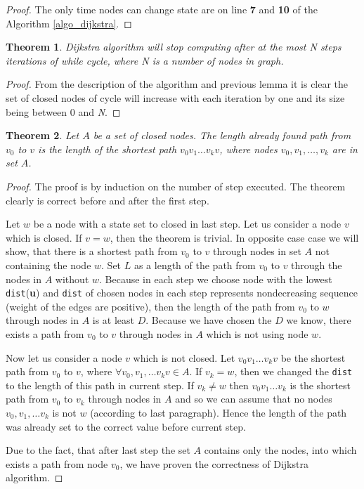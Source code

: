 \documentclass[thesis=M,english]{FITthesis}[2012/10/20]
\newtheorem{theorem}{Theorem}
\begin{document}
\begin{proof}
The only time nodes can change state are on line \textbf{7} and \textbf{10} of the Algorithm \ref{algo_dijkstra}.
\end{proof}

\begin{theorem}
\label{theorem2}
Dijkstra algorithm will stop computing after at the most \textit{N} steps iterations of while cycle, where N is a number of nodes in graph. 
\end{theorem}

\begin{proof}
From the description of the algorithm and previous lemma it is clear the set of closed nodes of cycle will increase with each iteration by one and its size being between 0 and \textit{N}.
\end{proof}

\begin{theorem}
Let $A$ be a set of closed nodes. The length already found path from $v_0$ to $v$ is the length of the shortest path $v_0 v_1 \dots v_k v$, where nodes $v_0, v_1, \dots , v_k$ are in set $A$.
\end{theorem}

\begin{proof}
The proof is by induction on the number of step executed. The theorem clearly is correct before and after the first step. 

Let $w$ be a node with a state set to closed in last step. Let us consider a node $v$ which is closed.
If $v=w$, then the theorem is trivial. In opposite case case we will show, that there is a shortest path from $v_0$ to $v$ through nodes in set $A$ not containing the node $w$. Set $L$ as a length of the path from $v_0$ to $v$ through the nodes in $A$ without $w$. Because in each step we choose node with the lowest \texttt{dist}(\textbf{u}) and \texttt{dist} of chosen nodes in each step represents nondecreasing sequence (weight of the edges are positive), then the length of the path from $v_0$ to $w$ through nodes in $A$ is at least $D$. Because we have chosen the $D$ we know, there exists a path from $v_0$ to $v$ through nodes in $A$ which is not using node $w$.

Now let us consider a node $v$ which is not closed. Let $v_0 v_1 \dots v_k v$ be the shortest path from $v_0$ to $v$, where $\forall v_0, v_1, \dots v_k v \in A$. 
If $v_k = w$, then we changed the \texttt{dist} to the length of this path in current step. If $v_k \neq w$ then $v_0 v_1 \dots v_k$ is the shortest path from $v_0$ to $v_k$ through nodes in $A$ and so we can assume that no nodes $v_0, v_1, \dots v_k $ is not $w$ (according to last paragraph). Hence the length of the path was already set to the correct value before current step.

Due to the fact, that after last step the set $A$ contains only the nodes, into which exists a path from node $v_0$, we have proven the correctness of Dijkstra algorithm.
\end{proof}
\end{document}
